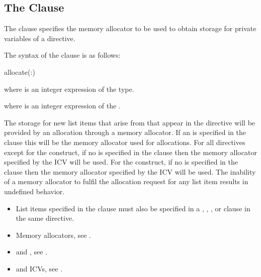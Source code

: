\subsection{The  Clause}
\label{subsec:allocate Clause}
\summary
The  clause specifies the memory allocator to be used to obtain storage for private variables of a directive.

\syntax

The syntax of the  clause is as follows:

\begin{boxedcode}
allocate(\plc{[allocator}:\plc{] list})
\end{boxedcode}

\begin{ccppspecific}
where  is an integer expression of the  type.
\end{ccppspecific}
\begin{fortranspecific}
where  is an integer expression of the  .
\end{fortranspecific}

\descr

The storage for new list items that arise from  that appear in the directive will be provided by an allocation through a memory allocator. If an  is specified in the clause this will be the memory allocator used for allocations. For all directives except for the  construct, if no  is specified in the clause then the memory allocator specified by the  ICV will be used. For the  construct, if no  is specified in the clause then the memory allocator specified by the  ICV will be used.  The inability of a memory allocator to fulfil the allocation request for any list item results in undefined behavior.

\restrictions
\begin{itemize}
\item List items specified in the  clause must also be specified in a , , ,  or
       clause in the same directive.
\end{itemize}

\crossreferences
\begin{itemize}
\item Memory allocators, see .
\item {} and , see .
\item {} and  ICVs, see .
\end{itemize}
